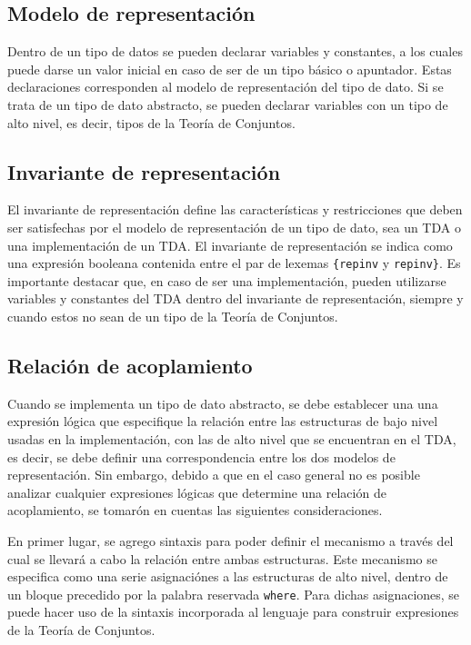 \subsection{Modelo de representación}
Dentro de un tipo de datos se pueden declarar variables y constantes, a los
cuales puede darse un valor inicial en caso de ser de un tipo básico o
apuntador. Estas declaraciones corresponden al modelo de representación
del tipo de dato. Si se trata de un tipo de dato abstracto, se pueden declarar
variables con un tipo de alto nivel, es decir, tipos de la Teoría de Conjuntos.

\subsection{Invariante de representación}
El invariante de representación define las características y restricciones que
deben ser satisfechas por el modelo de representación de un tipo de dato, sea un
TDA o una implementación de un TDA. El invariante de representación se indica
como una expresión booleana contenida entre el par de lexemas
\texttt{\{repinv} y \texttt{repinv\}}. Es importante destacar que, en caso de
ser una implementación, pueden utilizarse variables y constantes del TDA
dentro del invariante de representación, siempre y cuando estos no sean de un
tipo de la Teoría de Conjuntos.

\subsection{Relación de acoplamiento}

Cuando se implementa un tipo de dato abstracto, se debe establecer una una
expresión lógica que especifique la relación entre las estructuras de bajo
nivel usadas en la implementación, con las de alto nivel que se encuentran en
el TDA, es decir, se debe definir una correspondencia entre los dos modelos de
representación. Sin embargo, debido a que en el caso general no es posible
analizar cualquier expresiones lógicas que determine una relación de
acoplamiento, se tomarón en cuentas las siguientes consideraciones.

En primer lugar, se agrego sintaxis para poder definir el mecanismo a través
del cual se llevará a cabo la relación entre ambas estructuras. Este mecanismo
se especifica como una serie asignaciónes a las estructuras de alto nivel,
dentro de un bloque precedido por la palabra reservada \texttt{where}. Para
dichas asignaciones, se puede hacer uso de la sintaxis incorporada al lenguaje
para construir expresiones de la Teoría de Conjuntos.

